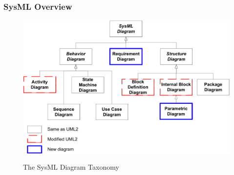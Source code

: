\documentclass[10pt]{beamer}
\begin{document}
\begin{frame}
\frametitle{SysML Overview}
\begin{center}
\begin{figure}%
\includegraphics[scale=0.45]{sysml_overview}\\
\caption{The SysML Diagram Taxonomy \cite{OMGSysMLSpecification}}
\end{figure}
\end{center}  
\end{frame}
\end{document}
